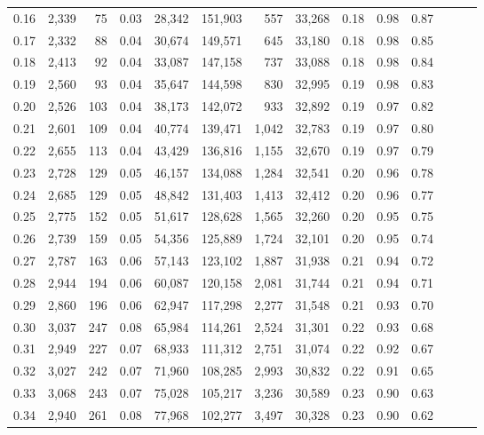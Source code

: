 \begin{tabular}{rrrrrrrrrrrrrr}
0.16 &  2,339 &   75 &  0.03 &   28,342 &  151,903 &     557 &  33,268 &  0.18 &  0.98 &      0.87 \\
0.17 &  2,332 &   88 &  0.04 &   30,674 &  149,571 &     645 &  33,180 &  0.18 &  0.98 &      0.85 \\
0.18 &  2,413 &   92 &  0.04 &   33,087 &  147,158 &     737 &  33,088 &  0.18 &  0.98 &      0.84 \\
0.19 &  2,560 &   93 &  0.04 &   35,647 &  144,598 &     830 &  32,995 &  0.19 &  0.98 &      0.83 \\
0.20 &  2,526 &  103 &  0.04 &   38,173 &  142,072 &     933 &  32,892 &  0.19 &  0.97 &      0.82 \\
0.21 &  2,601 &  109 &  0.04 &   40,774 &  139,471 &   1,042 &  32,783 &  0.19 &  0.97 &      0.80 \\
0.22 &  2,655 &  113 &  0.04 &   43,429 &  136,816 &   1,155 &  32,670 &  0.19 &  0.97 &      0.79 \\
0.23 &  2,728 &  129 &  0.05 &   46,157 &  134,088 &   1,284 &  32,541 &  0.20 &  0.96 &      0.78 \\
0.24 &  2,685 &  129 &  0.05 &   48,842 &  131,403 &   1,413 &  32,412 &  0.20 &  0.96 &      0.77 \\
0.25 &  2,775 &  152 &  0.05 &   51,617 &  128,628 &   1,565 &  32,260 &  0.20 &  0.95 &      0.75 \\
0.26 &  2,739 &  159 &  0.05 &   54,356 &  125,889 &   1,724 &  32,101 &  0.20 &  0.95 &      0.74 \\
0.27 &  2,787 &  163 &  0.06 &   57,143 &  123,102 &   1,887 &  31,938 &  0.21 &  0.94 &      0.72 \\
0.28 &  2,944 &  194 &  0.06 &   60,087 &  120,158 &   2,081 &  31,744 &  0.21 &  0.94 &      0.71 \\
0.29 &  2,860 &  196 &  0.06 &   62,947 &  117,298 &   2,277 &  31,548 &  0.21 &  0.93 &      0.70 \\
0.30 &  3,037 &  247 &  0.08 &   65,984 &  114,261 &   2,524 &  31,301 &  0.22 &  0.93 &      0.68 \\
0.31 &  2,949 &  227 &  0.07 &   68,933 &  111,312 &   2,751 &  31,074 &  0.22 &  0.92 &      0.67 \\
0.32 &  3,027 &  242 &  0.07 &   71,960 &  108,285 &   2,993 &  30,832 &  0.22 &  0.91 &      0.65 \\
0.33 &  3,068 &  243 &  0.07 &   75,028 &  105,217 &   3,236 &  30,589 &  0.23 &  0.90 &      0.63 \\
0.34 &  2,940 &  261 &  0.08 &   77,968 &  102,277 &   3,497 &  30,328 &  0.23 &  0.90 &      0.62 \\

\end{tabular}
